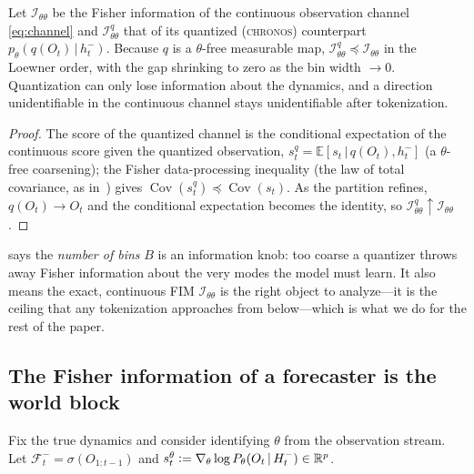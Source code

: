 \documentclass[10pt]{article}
\theoremstyle{plain}
\theoremstyle{definition}
\theoremstyle{remark}
\newcommand{\R}{\mathbb{R}}
\newcommand{\E}{\mathbb{E}}
\DeclareMathOperator{\Cov}{Cov}
\newcommand{\Fisher}{\mathcal{I}}
\newcommand{\Ith}{\Fisher_{\theta\theta}}
\newcommand{\given}{\,\vert\,}
\newcommand{\defeq}{\vcentcolon=}
\newcommand{\gth}{\nabla_{\theta}}
\newcommand{\wm}{P_{\theta}}
\newcommand{\Chronos}{\textsc{chronos}}
\begin{document}
\begin{proposition}\label{prop:quant}
Let $\Ith$ be the Fisher information of the continuous observation channel
\eqref{eq:channel} and $\Ith^{q}$ that of its quantized (\Chronos) counterpart
$p_\theta(q(O_t)\given h_t^-)$. Because $q$ is a $\theta$-free measurable map,
$\Ith^{q}\preceq\Ith$ in the Loewner order, with the gap shrinking to zero as
the bin width $\to0$. Quantization can only lose information about the dynamics,
and a direction unidentifiable in the continuous channel stays unidentifiable
after tokenization.
\end{proposition}
\begin{proof}
The score of the quantized channel is the conditional expectation of the
continuous score given the quantized observation, $s^q_t=\E[s_t\given q(O_t),
h_t^-]$ (a $\theta$-free coarsening); the Fisher data-processing inequality
(the law of total covariance, as in~\cite[Cor.~3.4]{wamvla}) gives
$\Cov(s^q_t)\preceq\Cov(s_t)$. As the partition refines, $q(O_t)\to O_t$ and the
conditional expectation becomes the identity, so $\Ith^q\uparrow\Ith$.
\end{proof}

 says the \emph{number of bins} $B$ is an information knob: too
coarse a quantizer throws away Fisher information about the very modes the model
must learn. It also means the exact, continuous FIM $\Ith$ is the right object to
analyze---it is the ceiling that any tokenization approaches from below---which
is what we do for the rest of the paper.

\subsection{The Fisher information of a forecaster is the world block}
Fix the true dynamics and consider identifying $\theta$ from the observation
stream. Let $\mathcal F_t^-=\sigma(O_{1:t-1})$ and
$s_t^\theta\defeq\gth\log\wm(O_t\given H_t^-)\in\R^p$.
\end{document}
